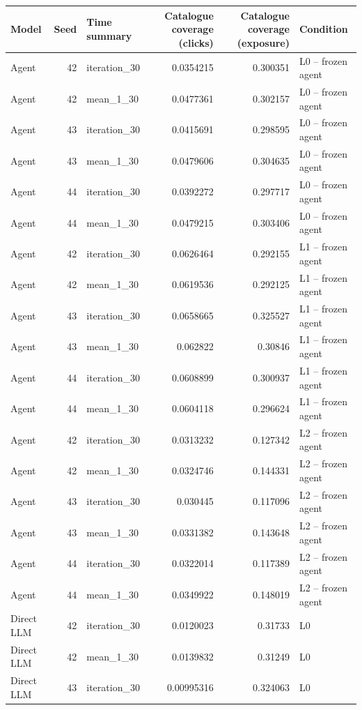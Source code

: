 \begin{table}[htbp!]
\centering
\small
\setlength{\tabcolsep}{3pt}
\renewcommand{\arraystretch}{1.1}
\begin{tabular}{lrlrrl}
\hline
Model & Seed & Time summary & Catalogue coverage (clicks) & Catalogue coverage (exposure) & Condition \\
\hline
Agent & 42 & iteration\_30 & 0.0354215 & 0.300351 & L0 -- frozen agent \\
Agent & 42 & mean\_1\_30 & 0.0477361 & 0.302157 & L0 -- frozen agent \\
Agent & 43 & iteration\_30 & 0.0415691 & 0.298595 & L0 -- frozen agent \\
Agent & 43 & mean\_1\_30 & 0.0479606 & 0.304635 & L0 -- frozen agent \\
Agent & 44 & iteration\_30 & 0.0392272 & 0.297717 & L0 -- frozen agent \\
Agent & 44 & mean\_1\_30 & 0.0479215 & 0.303406 & L0 -- frozen agent \\
Agent & 42 & iteration\_30 & 0.0626464 & 0.292155 & L1 -- frozen agent \\
Agent & 42 & mean\_1\_30 & 0.0619536 & 0.292125 & L1 -- frozen agent \\
Agent & 43 & iteration\_30 & 0.0658665 & 0.325527 & L1 -- frozen agent \\
Agent & 43 & mean\_1\_30 & 0.062822 & 0.30846 & L1 -- frozen agent \\
Agent & 44 & iteration\_30 & 0.0608899 & 0.300937 & L1 -- frozen agent \\
Agent & 44 & mean\_1\_30 & 0.0604118 & 0.296624 & L1 -- frozen agent \\
Agent & 42 & iteration\_30 & 0.0313232 & 0.127342 & L2 -- frozen agent \\
Agent & 42 & mean\_1\_30 & 0.0324746 & 0.144331 & L2 -- frozen agent \\
Agent & 43 & iteration\_30 & 0.030445 & 0.117096 & L2 -- frozen agent \\
Agent & 43 & mean\_1\_30 & 0.0331382 & 0.143648 & L2 -- frozen agent \\
Agent & 44 & iteration\_30 & 0.0322014 & 0.117389 & L2 -- frozen agent \\
Agent & 44 & mean\_1\_30 & 0.0349922 & 0.148019 & L2 -- frozen agent \\
Direct LLM & 42 & iteration\_30 & 0.0120023 & 0.31733 & L0 \\
Direct LLM & 42 & mean\_1\_30 & 0.0139832 & 0.31249 & L0 \\
Direct LLM & 43 & iteration\_30 & 0.00995316 & 0.324063 & L0 \\

\end{tabular}
\end{table}
